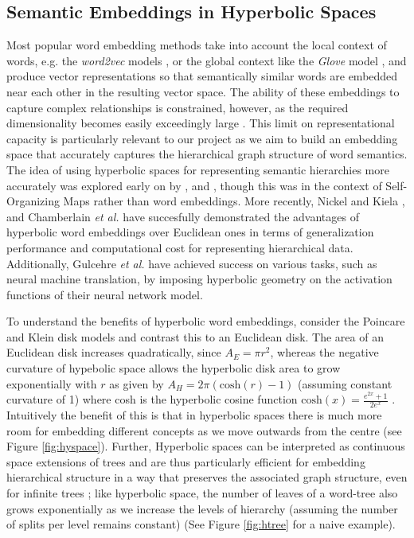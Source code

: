 \documentclass[12pt]{report}
\begin{document}
\subsection{Semantic Embeddings in Hyperbolic Spaces} \label{sec:poincare}
Most popular word embedding methods take into account the local context of words, e.g. the \textit{word2vec} models \cite{Mikolov, Mikolov2013}, or the global context like the \textit{Glove} model \cite{Pennington2014}, and produce vector representations so that semantically similar words are embedded near each other in the resulting vector space. The ability of these embeddings to capture complex relationships is constrained, however, as the required dimensionality becomes easily exceedingly large \cite{Nickel2017, Chamberlain2017, Nickel2018}. This limit on representational capacity is particularly relevant to our project as we aim to build an embedding space that accurately captures the hierarchical graph structure of word semantics. The idea of using hyperbolic spaces for representing semantic hierarchies more accurately was explored early on by \cite{Ritter1999}, \cite{Ontrup2002} and \cite{Walter2006}, though this was in the context of Self-Organizing Maps rather than word embeddings. More recently, Nickel and Kiela \cite{Nickel2017}, and Chamberlain \textit{et al.} \cite{Chamberlain2017} have succesfully demonstrated the advantages of hyperbolic word embeddings over Euclidean ones in terms of generalization performance and computational cost for representing hierarchical data. Additionally, Gulcehre \textit{et al.} \cite{Gulcehre2018} have achieved success on various tasks, such as neural machine translation, by imposing hyperbolic geometry on the activation functions of their neural network model.

To understand the benefits of hyperbolic word embeddings, consider the Poincare and Klein disk models and contrast this to an Euclidean disk. The area of an Euclidean disk increases quadratically, since $A_E=\pi r^2$, whereas the negative curvature of hypebolic space allows the hyperbolic disk area to grow exponentially with $r$ as given by $A_H=2 \pi \left(\text{cosh}(r) - 1 \right)$ (assuming constant curvature of 1) where cosh is the hyperbolic cosine function $\text{cosh}(x)=\frac{e^{2x} + 1}{2e^x}$ \cite{Greenberg1994}. Intuitively the benefit of this is that in hyperbolic spaces there is much more room for embedding different concepts as we move outwards from the centre (see Figure \ref{fig:hyspace}). Further, Hyperbolic spaces can be interpreted as continuous space extensions of trees and are thus particularly efficient for embedding hierarchical structure in a way that preserves the associated graph structure, even for infinite trees \cite{Chamberlain2017}; like hyperbolic space, the number of leaves of a word-tree also grows exponentially as we increase the levels of hierarchy (assuming the number of splits per level remains constant) \cite{Nickel2017} (See Figure \ref{fig:htree} for a naive example). 
\end{document}
